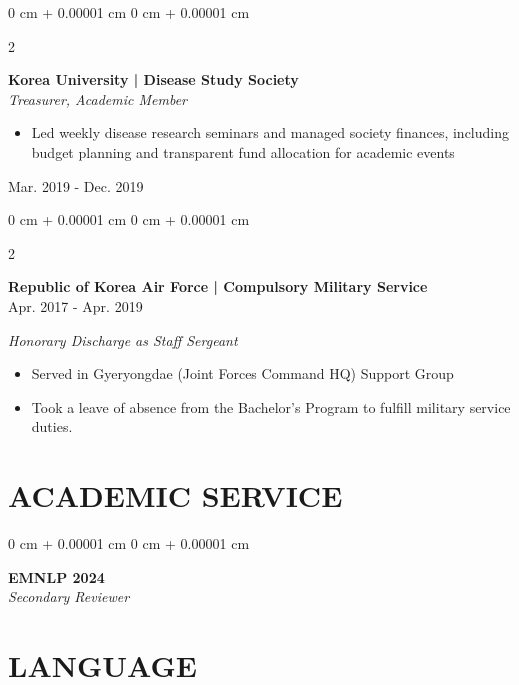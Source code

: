 \documentclass[10pt, letterpaper]{article}
\newenvironment{highlights}{
    \begin{itemize}[
        topsep=0.10 cm,
        parsep=0.10 cm,
        partopsep=0pt,
        itemsep=0pt,
        leftmargin=0 cm + 10pt
    ]
}{
    \end{itemize}
} %
\newenvironment{onecolentry}{
    \begin{adjustwidth}{
        0 cm + 0.00001 cm
    }{
        0 cm + 0.00001 cm
    }
}{
    \end{adjustwidth}
} %
\newenvironment{twocolentry}[2][]{
    \onecolentry
    \def\secondColumn{#2}
    \setcolumnwidth{\fill, 3.5 cm}
    \begin{paracol}{2}
}{
    \switchcolumn \raggedleft \secondColumn
    \end{paracol}
    \endonecolentry
} %
\begin{document}
        \begin{twocolentry}{
            Mar. 2019 - Dec. 2019\\ 
        }
        \textbf{Korea University | Disease Study Society}\\
\textit{Treasurer, Academic Member}
\begin{highlights}
    \item Led weekly disease research seminars and managed society finances, including budget planning and transparent fund allocation for academic events
\end{highlights}
        \end{twocolentry}
         \vspace{0.2 cm}
        \begin{twocolentry}{
            Apr. 2017 - Apr. 2019\\ 
        }
        \textbf{Republic of Korea Air Force | Compulsory Military Service}\\
        \end{twocolentry}
        \textit{Honorary Discharge as Staff Sergeant}
    \begin{highlights}
    \item Served in Gyeryongdae (Joint Forces Command HQ) Support Group
    \item Took a leave of absence from the Bachelor's Program to fulfill military service duties.
    \end{highlights}
            \vspace{0.2 cm}

    \section{ACADEMIC SERVICE}
        \vspace{0.2 cm}
    
        \begin{onecolentry}
            \textbf{EMNLP 2024} \\
            \textit{Secondary Reviewer}
        \end{onecolentry}
            \vspace{0.2 cm}
            
\section{LANGUAGE}
    
\end{document}
